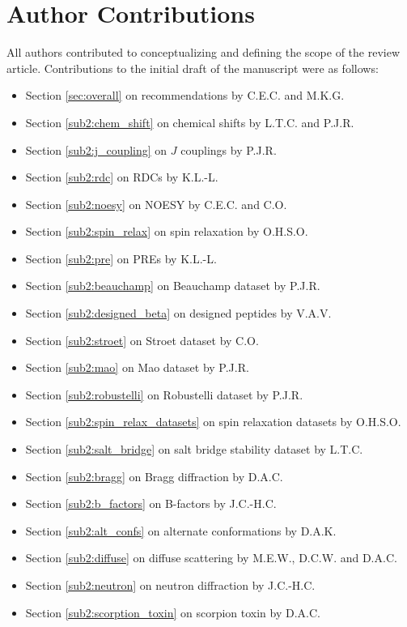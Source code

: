 \documentclass[9pt,review]{livecoms}
\begin{document}
\section*{Author Contributions}

All authors contributed to conceptualizing and defining the scope of the review article.
Contributions to the initial draft of the manuscript were as follows:
\begin{itemize}
    \item Section \ref{sec:overall} on recommendations by C.E.C. and M.K.G.
    \item Section \ref{sub2:chem_shift} on chemical shifts by L.T.C. and P.J.R.
    \item Section \ref{sub2:j_coupling} on $J$ couplings by P.J.R.
    \item Section \ref{sub2:rdc} on RDCs by K.L.-L.
    \item Section \ref{sub2:noesy} on NOESY by C.E.C. and C.O.
    \item Section \ref{sub2:spin_relax} on spin relaxation by O.H.S.O.
    \item Section \ref{sub2:pre} on PREs by K.L.-L.
    \item Section \ref{sub2:beauchamp} on Beauchamp dataset by P.J.R.
    \item Section \ref{sub2:designed_beta} on designed peptides by V.A.V.
    \item Section \ref{sub2:stroet} on Stroet dataset by C.O.
    \item Section \ref{sub2:mao} on Mao dataset by P.J.R.
    \item Section \ref{sub2:robustelli} on Robustelli dataset by P.J.R.
    \item Section \ref{sub2:spin_relax_datasets} on spin relaxation datasets by O.H.S.O.
    \item Section \ref{sub2:salt_bridge} on salt bridge stability dataset by L.T.C.
    \item Section \ref{sub2:bragg} on Bragg diffraction by D.A.C.
    \item Section \ref{sub2:b_factors} on B-factors by J.C.-H.C.
    \item Section \ref{sub2:alt_confs} on alternate conformations by D.A.K.
    \item Section \ref{sub2:diffuse} on diffuse scattering by M.E.W., D.C.W. and D.A.C.
    \item Section \ref{sub2:neutron} on neutron diffraction by J.C.-H.C.
    \item Section \ref{sub2:scorption_toxin} on scorpion toxin by D.A.C.

\end{itemize}
\end{document}

